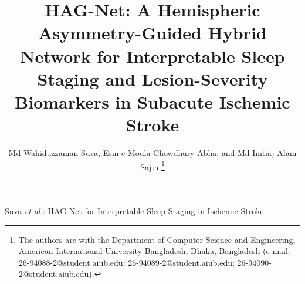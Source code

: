 \documentclass[journal]{IEEEtran}
\begin{document}
\title{HAG-Net: A Hemispheric Asymmetry-Guided Hybrid Network for Interpretable Sleep Staging and Lesion-Severity Biomarkers in Subacute Ischemic Stroke}

\author{Md Wahiduzzaman Suva, Esm-e Moula Chowdhury Abha, and Md Imtiaj Alam Sajin%
\thanks{The authors are with the Department of Computer Science and Engineering,
American International University-Bangladesh, Dhaka, Bangladesh
(e-mail: 26-94088-2@student.aiub.edu; 26-94089-2@student.aiub.edu;
26-94090-2@student.aiub.edu).}}

%
{Suva \MakeLowercase{\textit{et al.}}: HAG-Net for Interpretable Sleep Staging in Ischemic Stroke}

\maketitle
\end{document}

